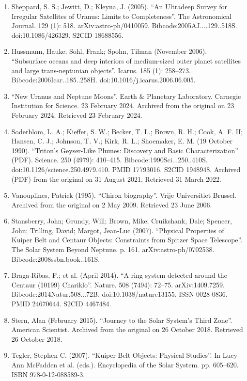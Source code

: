 \begin{enumerate}
\item Sheppard, S. S.; Jewitt, D.; Kleyna, J. (2005). ``An Ultradeep Survey for Irregular Satellites of Uranus: Limits to Completeness''. The Astronomical Journal. 129 (1): 518. arXiv:astro-ph/0410059. Bibcode:2005AJ....129..518S. doi:10.1086/426329. S2CID 18688556.
\item Hussmann, Hauke; Sohl, Frank; Spohn, Tilman (November 2006). ``Subsurface oceans and deep interiors of medium-sized outer planet satellites and large trans-neptunian objects''. Icarus. 185 (1): 258–273. Bibcode:2006Icar..185..258H. doi:10.1016/j.icarus.2006.06.005.
\item ``New Uranus and Neptune Moons''. Earth \& Planetary Laboratory. Carnegie Institution for Science. 23 February 2024. Archived from the original on 23 February 2024. Retrieved 23 February 2024.
\item Soderblom, L. A.; Kieffer, S. W.; Becker, T. L.; Brown, R. H.; Cook, A. F. II; Hansen, C. J.; Johnson, T. V.; Kirk, R. L.; Shoemaker, E. M. (19 October 1990). ``Triton's Geyser-Like Plumes: Discovery and Basic Characterization'' (PDF). Science. 250 (4979): 410–415. Bibcode:1990Sci...250..410S. doi:10.1126/science.250.4979.410. PMID 17793016. S2CID 1948948. Archived (PDF) from the original on 31 August 2021. Retrieved 31 March 2022.
\item Vanouplines, Patrick (1995). ``Chiron biography''. Vrije Universitiet Brussel. Archived from the original on 2 May 2009. Retrieved 23 June 2006.
\item Stansberry, John; Grundy, Will; Brown, Mike; Cruikshank, Dale; Spencer, John; Trilling, David; Margot, Jean-Luc (2007). ``Physical Properties of Kuiper Belt and Centaur Objects: Constraints from Spitzer Space Telescope''. The Solar System Beyond Neptune. p. 161. arXiv:astro-ph/0702538. Bibcode:2008ssbn.book..161S.
\item Braga-Ribas, F.; et al. (April 2014). ``A ring system detected around the Centaur (10199) Chariklo''. Nature. 508 (7494): 72–75. arXiv:1409.7259. Bibcode:2014Natur.508...72B. doi:10.1038/nature13155. ISSN 0028-0836. PMID 24670644. S2CID 4467484.
\item Stern, Alan (February 2015). ``Journey to the Solar System's Third Zone''. American Scientist. Archived from the original on 26 October 2018. Retrieved 26 October 2018.
\item Tegler, Stephen C. (2007). ``Kuiper Belt Objects: Physical Studies''. In Lucy-Ann McFadden et al. (eds.). Encyclopedia of the Solar System. pp. 605–620. ISBN 978-0-12-088589-3.

\end{enumerate}
